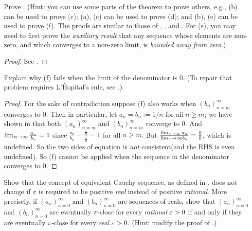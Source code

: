 \begin{exercise} \label{exercise 6.1.8}
Prove .
(Hint: you can use some parts of the theorem to prove others, e.g., (b) can be used to prove (c);
(a), (c) can be used to prove (d);
and (b), (e) can be used to prove (f).
The proofs are similar to those of , , and .
For (e), you may need to first prove the \emph{auxiliary result} that any sequence whose elements are non-zero, and which converges to a non-zero limit, is \emph{bounded away from zero}.)
\end{exercise}

\begin{proof}
See .
\end{proof}

\begin{exercise} \label{exercise 6.1.9}
Explain why (f) fails when the limit of the denominator is \(0\).
(To repair that problem requires L’\^{H}opital’s rule, see .)
\end{exercise}

\begin{proof}
For the sake of contradiction suppose (f) also works when \((b_n)_{n = m}^{\infty}\) converges to \(0\).
Then in particular, let \(a_n = b_n := 1/n\) for all \(n \ge m\); we have shown in  that both \((a_n)_{n = m}^{\infty}\) and \((b_n)_{n = m}^{\infty}\) converge to \(0\).
And \(\lim_{n \to \infty} \frac{a_n}{b_n} = 1\) since \(\frac{a_n}{b_n} = \frac{\frac{1}{n}}{\frac{1}{n}} = 1\) for all \(n \ge m\).
But \(\frac{\lim_{n \to \infty} a_n}{\lim_n \to \infty b_n} = \frac{0}{0}\), which is undefined.
So the two sides of equation is \emph{not} consistent(and the RHS is even undefined).
So (f) cannot be applied when the sequence in the denominator converges to \(0\).
\end{proof}

\begin{exercise} \label{exercise 6.1.10}
Show that the concept of equivalent Cauchy sequence, as defined in , does not change if \(\varepsilon\) is required to be positive \emph{real} instead of positive \emph{rational}.
More precisely, if \((a_n)_{n = 0}^{\infty}\) and \((b_n)_{n = 0}^{\infty}\) are sequences of reals, show that \((a_n)_{n = 0}^{\infty}\) and \((b_n)_{n = 0}^{\infty}\) are eventually \(\varepsilon\)-close for every \emph{rational} \(\varepsilon > 0\) if and only if they are eventually \(\varepsilon\)-close for every \emph{real} \(\varepsilon > 0\).
(Hint: modify the proof of .)
\end{exercise}

